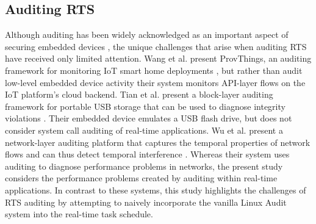 \subsection{Auditing RTS} Although auditing has been widely acknowledged as an important aspect of securing embedded devices \cite{embedded_audit_1,embedded_audit_2,embedded_audit_3},
the unique challenges that arise when auditing RTS have received only limited attention.
Wang et al. present ProvThings, an auditing framework for monitoring IoT smart home deployments \cite{Wang2017},
  but rather than audit low-level embedded device activity their system monitors API-layer flows on the IoT platform's cloud backend.
Tian et al. present a block-layer auditing framework for portable USB storage  that can be used to diagnose integrity violations \cite{Tian2016}.
Their embedded device emulates a USB flash drive, 
  but does not consider system call auditing of real-time applications.
Wu et al. present a network-layer auditing platform that captures the temporal properties of network flows and can
  thus detect temporal interference \cite{Wu2019}.  
Whereas their system uses auditing to diagnose performance problems in networks,
  the present study considers the performance problems created by auditing within real-time applications.
In contrast to these systems, this study highlights
  the challenges of RTS auditing by attempting to naively incorporate the vanilla Linux Audit system into the real-time task schedule.